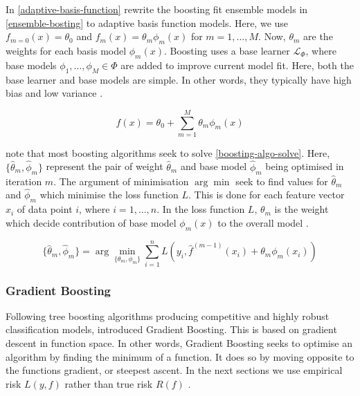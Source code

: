 In \autoref{adaptive-basis-function} \textcite{ntnu-thesis-why-does-xgboost-win-every-machine-learning-competition} rewrite the boosting fit ensemble models in \autoref{ensemble-bosting} to adaptive basis function models. Here, we use $f_{m=0}(x)=\theta_0$ and $f_m(x)=\theta_m\phi_m(x)$ for $m=1,\dots,M$. Now, $\theta_m$ are the weights for each basis model $\phi_m(x)$. Boosting uses a base learner $\mathcal{L}_\Phi$, where base models $\phi_1,\dots,\phi_M\in\Phi$ are added to improve current model fit. Here, both the base learner and base models are simple. In other words, they typically have high bias and low variance \parencite{ntnu-thesis-why-does-xgboost-win-every-machine-learning-competition}.

\vspace{-1em}
\begin{equation}
\label{adaptive-basis-function}
    f(x)=\theta_0+\sum_{m=1}^{M}\theta_m\phi_m(x)
\end{equation}

\textcite{ntnu-thesis-why-does-xgboost-win-every-machine-learning-competition} note that most boosting algorithms seek to solve \autoref{boosting-algo-solve}. Here, $\{\hat{\theta}_m,\hat{\phi}_m\}$ represent the pair of weight $\hat{\theta}_m$ and base model $\hat{\phi}_m$ being optimised in iteration $m$. The argument of minimisation $\arg\min$ seek to find values for $\hat{\theta}_m$ and $\hat{\phi}_m$ which minimise the loss function $L$. This is done for each feature vector $x_i$ of data point $i$, where $i=1,\dots,n$. In the loss function $L$, $\theta_m$ is the weight which decide contribution of base model $\phi_m(x)$ to the overall model \parencite{ntnu-thesis-why-does-xgboost-win-every-machine-learning-competition}. 

\vspace{-1em}
\begin{equation}
\label{boosting-algo-solve}
    \{\hat{\theta}_m,\hat{\phi}_m\} = \arg\min_{\{\theta_m,\phi_m\}} \sum_{i=1}^{n} L(y_i,\hat{f}^{(m-1)}(x_i)+\theta_m\phi_m(x_i))
\end{equation}

\subsubsection{Gradient Boosting}

Following tree boosting algorithms producing competitive and highly robust classification models, \textcite{friedman-greedy-function-approximation} introduced Gradient Boosting. This is based on gradient descent in function space. In other words, Gradient Boosting seeks to optimise an algorithm by finding the minimum of a function. It does so by moving opposite to the functions gradient, or steepest ascent. In the next sections we use empirical risk $L(y,f)$ rather than true risk $R(f)$ \parencite{ntnu-thesis-why-does-xgboost-win-every-machine-learning-competition}. 

